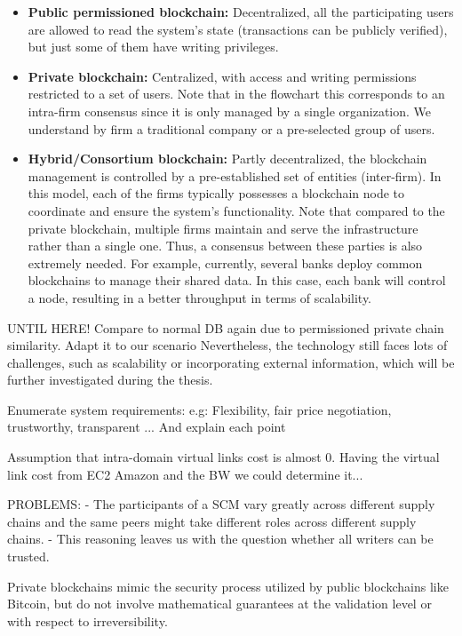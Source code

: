 \begin{itemize}
	\item \textbf{Public permissioned blockchain:} Decentralized, all the participating users are allowed to read the system's state (transactions can be publicly verified), but just some of them have writing privileges.
	\item \textbf{Private blockchain:} Centralized, with access and writing permissions restricted to a set of users. Note that in the flowchart this corresponds to an intra-firm consensus since it is only managed by a single organization. We understand by firm a traditional company or a pre-selected group of users.
	\item \textbf{Hybrid/Consortium blockchain:} Partly decentralized, the blockchain management is controlled by a pre-established set of entities (inter-firm). In this model, each of the firms typically possesses a blockchain node to coordinate and ensure the system's functionality. Note that compared to the private blockchain, multiple firms maintain and serve the infrastructure rather than a single one. Thus, a consensus between these parties is also extremely needed. For example, currently, several banks deploy common blockchains to manage their shared data. In this case, each bank will control a node, resulting in a better throughput in terms of scalability.
\end{itemize}

UNTIL HERE!
Compare to normal DB again due to permissioned private chain similarity.
Adapt it to our scenario
Nevertheless, the technology still faces lots of challenges, such as scalability or incorporating external information, which will be further investigated during the thesis.

Enumerate system requirements: e.g: Flexibility, fair price negotiation, trustworthy, transparent ... And explain each point

Assumption that intra-domain virtual links cost is almost 0. Having the virtual link cost from EC2 Amazon and the BW we could determine it...

PROBLEMS: -  The participants of a SCM vary greatly across different supply
chains and the same peers might take different roles across different supply chains. - This reasoning leaves us with the question whether all writers
can be trusted. 

Private blockchains mimic the security process utilized by public blockchains like Bitcoin, but do not involve mathematical guarantees at the validation level or with respect to irreversibility. 

